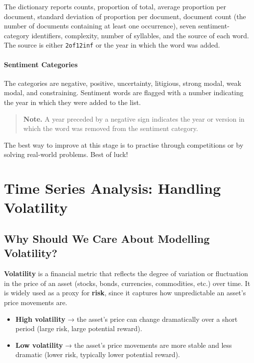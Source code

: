 \documentclass[12pt,openany]{book}
\theoremstyle{definition}
\theoremstyle{remark}
\begin{document}
The dictionary reports counts, proportion of total, average proportion per
document, standard deviation of proportion per document, document count
(the number of documents containing at least one occurrence), seven
sentiment-category identifiers, complexity, number of syllables, and the
source of each word. The source is either \texttt{2of12inf} or the year in
which the word was added.



\subsubsection{Sentiment Categories}

The categories are negative, positive, uncertainty, litigious, strong modal,
weak modal, and constraining. Sentiment words are flagged with a number
indicating the year in which they were added to the list.

\begin{quote}
\textbf{Note.} A year preceded by a negative sign indicates the year or
version in which the word was removed from the sentiment category.
\end{quote}

The best way to improve at this stage is to practise through competitions or
by solving real-world problems. Best of luck!

\chapter{Time Series Analysis: Handling Volatility}

\section{Why Should We Care About Modelling Volatility?}

\textbf{Volatility} is a financial metric that reflects the degree of variation or fluctuation in the price of an asset (stocks, bonds, currencies, commodities, etc.) over time. It is widely used as a proxy for \textbf{risk}, since it captures how unpredictable an asset's price movements are.

\begin{itemize}
\item \textbf{High volatility} → the asset's price can change dramatically over a short period (large risk, large potential reward).
\item \textbf{Low volatility} → the asset's price movements are more stable and less dramatic (lower risk, typically lower potential reward).
\end{itemize}
\end{document}
